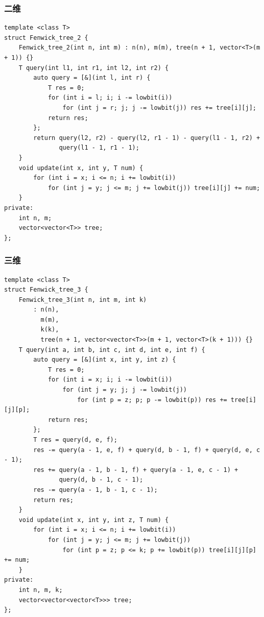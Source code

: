 \documentclass[UTF8]{ctexart}
\begin{document}
\begin{sloppypar}
\subsubsection{二维}

\begin{lstlisting}[style=cpp]
template <class T>
struct Fenwick_tree_2 {
    Fenwick_tree_2(int n, int m) : n(n), m(m), tree(n + 1, vector<T>(m + 1)) {}
    T query(int l1, int r1, int l2, int r2) {
        auto query = [&](int l, int r) {
            T res = 0;
            for (int i = l; i; i -= lowbit(i))
                for (int j = r; j; j -= lowbit(j)) res += tree[i][j];
            return res;
        };
        return query(l2, r2) - query(l2, r1 - 1) - query(l1 - 1, r2) +
               query(l1 - 1, r1 - 1);
    }
    void update(int x, int y, T num) {
        for (int i = x; i <= n; i += lowbit(i))
            for (int j = y; j <= m; j += lowbit(j)) tree[i][j] += num;
    }
private:
    int n, m;
    vector<vector<T>> tree;
};
\end{lstlisting}

\subsubsection{三维}

\begin{lstlisting}[style=cpp]
template <class T>
struct Fenwick_tree_3 {
    Fenwick_tree_3(int n, int m, int k)
        : n(n),
          m(m),
          k(k),
          tree(n + 1, vector<vector<T>>(m + 1, vector<T>(k + 1))) {}
    T query(int a, int b, int c, int d, int e, int f) {
        auto query = [&](int x, int y, int z) {
            T res = 0;
            for (int i = x; i; i -= lowbit(i))
                for (int j = y; j; j -= lowbit(j))
                    for (int p = z; p; p -= lowbit(p)) res += tree[i][j][p];
            return res;
        };
        T res = query(d, e, f);
        res -= query(a - 1, e, f) + query(d, b - 1, f) + query(d, e, c - 1);
        res += query(a - 1, b - 1, f) + query(a - 1, e, c - 1) +
               query(d, b - 1, c - 1);
        res -= query(a - 1, b - 1, c - 1);
        return res;
    }
    void update(int x, int y, int z, T num) {
        for (int i = x; i <= n; i += lowbit(i))
            for (int j = y; j <= m; j += lowbit(j))
                for (int p = z; p <= k; p += lowbit(p)) tree[i][j][p] += num;
    }
private:
    int n, m, k;
    vector<vector<vector<T>>> tree;
};
\end{lstlisting}


\end{sloppypar}
\end{document}
